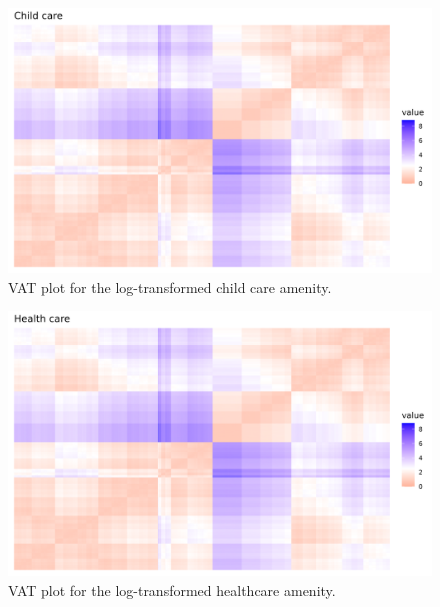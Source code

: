 \documentclass[11pt, a4paper]{article}
\begin{document}
{\begin{figure}[H]
\centering
\includegraphics[width=\textwidth]{./vat/childcare_vat_log.png}
\caption[Child care VAT plot]{VAT plot for the log-transformed child care amenity.}\label{childcarevat}
\end{figure}








\begin{figure}[H]
\centering
\includegraphics[width=\textwidth]{./vat/healthcare_vat_log.png}
\caption[Health care VAT plot]{VAT plot for the log-transformed healthcare amenity.}\label{healthcarevat}
\end{figure}







}
\end{document}

